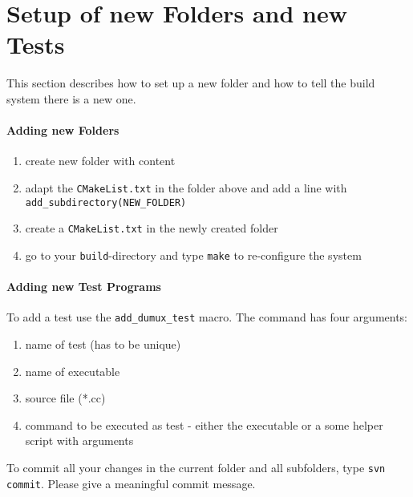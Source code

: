 \section{Setup of new Folders and new Tests}
\label{sc_newfoldersetup}
This section describes how to set up a new folder and how to tell
the build system there is a new one.
\paragraph{Adding new Folders}
\begin{enumerate}[1)]
 \item create new folder with content
 \item adapt the \verb+CMakeList.txt+ in the folder above and add a line with
       \verb+add_subdirectory(NEW_FOLDER)+
 \item create a \verb+CMakeList.txt+ in the newly created folder
 \item go to your \texttt{build}-directory and type \verb+make+ to
       re-configure the system
\end{enumerate}

\paragraph{Adding new Test Programs}
\noindent To add a test use the \texttt{add\_dumux\_test} macro.
The command has four arguments:
\begin{enumerate}[1)]
  \item name of test (has to be unique)
  \item name of executable
  \item source file (*.cc)
  \item command to be executed as test - either the executable or a
        some helper script with arguments
\end{enumerate}

To commit all your changes in the current folder and all subfolders, type \texttt{svn commit}.
Please give a meaningful commit message.
